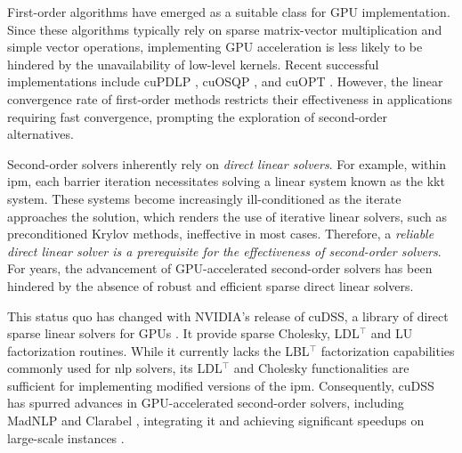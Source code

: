 \documentclass{article}
\begin{document}
First-order algorithms have emerged as a suitable class for GPU implementation. Since these algorithms typically rely on sparse matrix-vector multiplication and simple vector operations, implementing GPU acceleration is less likely to be hindered by the unavailability of low-level kernels. Recent successful implementations include cuPDLP \cite{luCuPDLPCStrengthenedImplementation2024,luCuPDLPFurtherEnhanced2025}, cuOSQP \cite{schubigerGPUAccelerationADMM2020}, and cuOPT \cite{NVIDIACuopt2025}. However, the linear convergence rate of first-order methods restricts their effectiveness in applications requiring fast convergence, prompting the exploration of second-order alternatives.

Second-order solvers inherently rely on \emph{direct linear solvers}. For example, within \gls*{ipm}, each barrier iteration necessitates solving a linear system known as the \gls*{kkt} system. These systems become increasingly ill-conditioned as the iterate approaches the solution, which renders the use of iterative linear solvers, such as preconditioned Krylov methods, ineffective in most cases.
Therefore, a \emph{reliable direct linear solver is a prerequisite for the effectiveness of second-order solvers}. For years, the advancement of GPU-accelerated second-order solvers has been hindered by the absence of robust and efficient sparse direct linear solvers.

This status quo has changed with NVIDIA's release of cuDSS, a library of direct sparse linear solvers for GPUs \cite{nvidiaNVIDIACuDSSPreview}.
It provide sparse Cholesky, LDL$^\top$ and LU factorization routines.
While it currently lacks the LBL$^\top$ factorization capabilities commonly used for \gls*{nlp} solvers, its LDL$^\top$ and Cholesky functionalities are sufficient for implementing modified versions of the \gls*{ipm}.
Consequently, cuDSS has spurred advances in GPU-accelerated second-order solvers, including MadNLP \cite{shinAcceleratingOptimalPower2024} and Clarabel \cite{goulartClarabelInteriorpointSolver2024}, integrating it and achieving significant speedups on large-scale instances \cite{shinNVIDIACuDSSLibrary2024,shinAcceleratingOptimalPower2024,pacaudCondensedspaceMethodsNonlinear2024,shinScalableMultiPeriodAC2024,pacaudGPUacceleratedDynamicNonlinear2024}.
\end{document}
